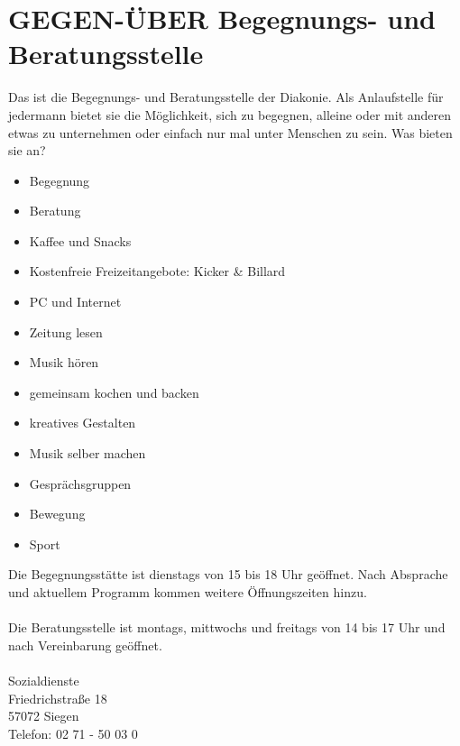\section{GEGEN-ÜBER Begegnungs- und Beratungsstelle}
Das ist die Begegnungs- und Beratungsstelle der Diakonie. Als Anlaufstelle für jedermann bietet sie die Möglichkeit, sich zu begegnen, alleine oder mit anderen etwas zu unternehmen oder einfach nur mal unter Menschen zu sein. Was bieten sie an?

\begin{itemize}
	\item Begegnung
	\item Beratung
	\item Kaffee und Snacks
	\item Kostenfreie Freizeitangebote: Kicker \& Billard
	\item PC und Internet
	\item Zeitung lesen
	\item Musik hören
	\item gemeinsam kochen und backen
	\item kreatives Gestalten
	\item Musik selber machen
	\item Gesprächsgruppen
	\item Bewegung
	\item Sport
\end{itemize}

Die Begegnungsstätte ist dienstags von 15 bis 18 Uhr geöffnet. Nach Absprache und aktuellem Programm kommen weitere Öffnungszeiten hinzu.\\
\\
Die Beratungsstelle ist montags, mittwochs und freitags von 14 bis 17 Uhr und nach Vereinbarung geöffnet.\\
\\
Sozialdienste \\
Friedrichstraße 18\\
57072 Siegen\\
Telefon: 02 71 - 50 03 0